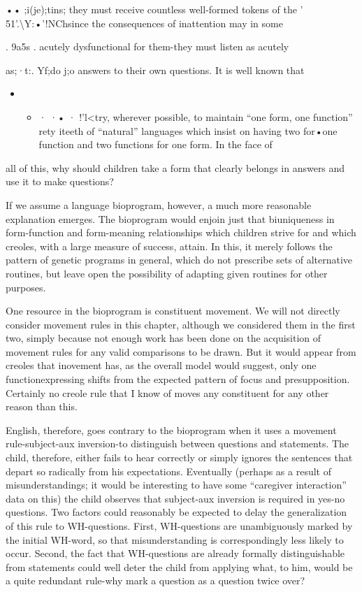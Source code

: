 •• ;i(je);tins; they must receive countless well-formed tokens of the ' 51'.{\textbackslash}Y:•'!NChsince the consequences of inattention may in some

. 9a5s . acutely dysfunctional for them-they must listen as acutely

as;·t:. Yf;do j;o answers to their own questions. It is well known that

\begin{itemize}
\item \begin{itemize}
\item · ·• · !'l{\textless}try, wherever possible, to maintain ``one form, one function'' rety iteeth of ``natural'' languages which insist on having two for•one function and two functions for one form. In the face of
\end{itemize}
\end{itemize}


all of this, why should children take a form that clearly belongs in answers and use it to make questions?

If we assume a language bioprogram, however, a much more reasonable explanation emerges. The bioprogram would enjoin just that biuniqueness in form-function and form-meaning relationships which children strive for and which creoles, with a large measure of success, attain. In this, it merely follows the pattern of genetic programs in general, which do not prescribe sets of alternative routines, but leave open the possibility of adapting given routines for other purposes.

One resource in the bioprogram is constituent movement. We will not directly consider movement rules in this chapter, although we considered them in the first two, simply because not enough work has been done on the acquisition of movement rules for any valid comparisons to be drawn. But it would appear from creoles that inove\-ment has, as the overall model would suggest, only one function\-expressing shifts from the expected pattern of focus and presupposi\-tion. Certainly no creole rule that I know of moves any constituent for any other reason than this.

English, therefore, goes contrary to the bioprogram when it uses a movement rule-subject-aux inversion-to distinguish between ques\-tions and statements. The child, therefore, either fails to hear correctly or simply ignores the sentences that depart so radically from his expec\-tations. Eventually (perhaps as a result of misunderstandings; it would be interesting to have some ``caregiver interaction'' data on this) the child observes that subject-aux inversion is required in yes-no questions. Two factors could reasonably be expected to delay the generalization of this rule to WH-questions. First, WH-questions are unambiguously marked by the initial WH-word, so that misunderstanding is corre\-spondingly less likely to occur. Second, the fact that WH-questions are already formally distinguishable from statements could well deter the child from applying what, to him, would be a quite redundant rule-why mark a question as a question twice over?

